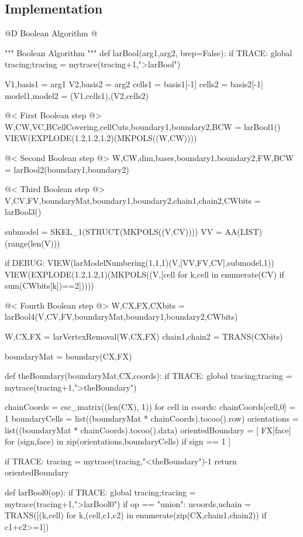 \documentclass[11pt,oneside]{article}	%
\begin{document}
\subsection{Implementation}


@D Boolean Algorithm
@{""" Boolean Algorithm """
def larBool(arg1,arg2, brep=False):
	if TRACE: global tracing;tracing = mytrace(tracing+1,">larBool")

	V1,basis1 = arg1
	V2,basis2 = arg2
	cells1 = basis1[-1]
	cells2 = basis2[-1]
	model1,model2 = (V1,cells1),(V2,cells2)
		
	@< First Boolean step @>
	W,CW,VC,BCellCovering,cellCuts,boundary1,boundary2,BCW = larBool1()
	VIEW(EXPLODE(1.2,1.2,1.2)(MKPOLS((W,CW))))
	
	@< Second Boolean step @>
	W,CW,dim,bases,boundary1,boundary2,FW,BCW = larBool2(boundary1,boundary2)

	@< Third Boolean step @>
	V,CV,FV,boundaryMat,boundary1,boundary2,chain1,chain2,CWbits = larBool3()
	
	submodel = SKEL_1(STRUCT(MKPOLS((V,CV))))
	VV = AA(LIST)(range(len(V)))
	
	if DEBUG:
		VIEW(larModelNumbering(1,1,1)(V,[VV,FV,CV],submodel,1))
		VIEW(EXPLODE(1.2,1.2,1)(MKPOLS((V,[cell for k,cell in enumerate(CV) if sum(CWbits[k])==2]))))
	
	@< Fourth Boolean step @>
	W,CX,FX,CXbits = larBool4(V,CV,FV,boundaryMat,boundary1,boundary2,CWbits)

	W,CX,FX = larVertexRemoval(W,CX,FX)
	chain1,chain2 = TRANS(CXbits)
	
	boundaryMat = boundary(CX,FX)

	def theBoundary(boundaryMat,CX,coords):
		if TRACE: global tracing;tracing = mytrace(tracing+1,">theBoundary")

		chainCoords = csc_matrix((len(CX), 1))
		for cell in coords: chainCoords[cell,0] = 1
		boundaryCells = list((boundaryMat * chainCoords).tocoo().row)
		orientations = list((boundaryMat * chainCoords).tocoo().data)
		orientedBoundary = [ FX[face] for (sign,face) in zip(orientations,boundaryCells)  if sign == 1 ]

		if TRACE: tracing = mytrace(tracing,"<theBoundary")-1
		return orientedBoundary


	def larBool0(op):
		if TRACE: global tracing;tracing = mytrace(tracing+1,">larBool0")
		if op == "union": 
			ucoords,uchain = TRANS([(k,cell) for k,(cell,c1,c2) in enumerate(zip(CX,chain1,chain2)) if c1+c2>=1])

}
\end{document}
